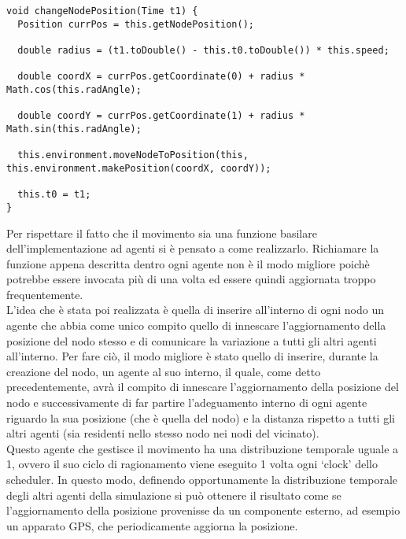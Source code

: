\medskip
\begin{lstlisting}[firstnumber=1,label={lst:ImplementazioneAggiornamentoPosizioneNodo},caption={Implementazione aggiornamento posizione nodo}]
void changeNodePosition(Time t1) {
  Position currPos = this.getNodePosition();
  
  double radius = (t1.toDouble() - this.t0.toDouble()) * this.speed;
  
  double coordX = currPos.getCoordinate(0) + radius * Math.cos(this.radAngle);
  
  double coordY = currPos.getCoordinate(1) + radius * Math.sin(this.radAngle);
  
  this.environment.moveNodeToPosition(this, this.environment.makePosition(coordX, coordY));
  
  this.t0 = t1;
}
\end{lstlisting}

Per rispettare il fatto che il movimento sia una funzione basilare dell'implementazione ad agenti si è pensato a come realizzarlo. Richiamare la funzione appena descritta dentro ogni agente non è il modo migliore poichè potrebbe essere invocata più di una volta ed essere quindi aggiornata troppo frequentemente.
\\
L'idea che è stata poi realizzata è quella di inserire all'interno di ogni nodo un agente che abbia come unico compito quello di innescare l'aggiornamento della posizione del nodo stesso e di comunicare la variazione a tutti gli altri agenti all'interno. Per fare ciò, il modo migliore è stato quello di inserire, durante la creazione del nodo, un agente al suo interno, il quale, come detto precedentemente, avrà il compito di innescare l'aggiornamento della posizione del nodo e successivamente di far partire l'adeguamento interno di ogni agente riguardo la sua posizione (che è quella del nodo) e la distanza rispetto a tutti gli altri agenti (sia residenti nello stesso nodo nei nodi del vicinato).
\\
Questo agente che gestisce il movimento ha una distribuzione temporale uguale a 1, ovvero il suo ciclo di ragionamento viene eseguito 1 volta ogni `clock' dello scheduler. In questo modo, definendo opportunamente la distribuzione temporale degli altri agenti della simulazione si può ottenere il risultato come se l'aggiornamento della posizione provenisse da un componente esterno, ad esempio un apparato GPS, che periodicamente aggiorna la posizione.

